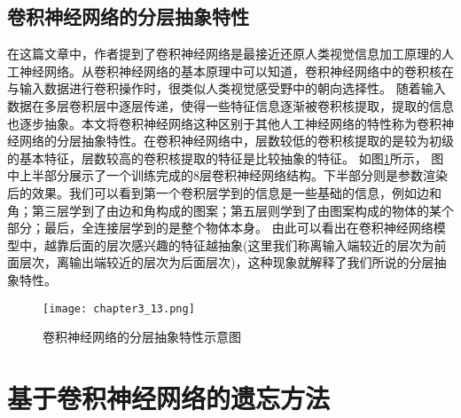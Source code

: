 \subsection{卷积神经网络的分层抽象特性}
在这篇文章\cite{2019arXiv190906161K}中，作者提到了卷积神经网络是最接近还原人类视觉信息加工原理的人工神经网络。从卷积神经网络的基本原理中可以知道，卷积神经网络中的卷积核在与输入数据进行卷积操作时，很类似人类视觉感受野中的朝向选择性。
随着输入数据在多层卷积层中逐层传递，使得一些特征信息逐渐被卷积核提取，提取的信息也逐步抽象。本文将卷积神经网络这种区别于其他人工神经网络的特性称为卷积神经网络的分层抽象特性。在卷积神经网络中，层数较低的卷积核提取的是较为初级的基本特征，层数较高的卷积核提取的特征是比较抽象的特征。
如图\ref{fig:chapter3_13}所示， 图中上半部分展示了一个训练完成的8层卷积神经网络结构。下半部分则是参数渲染后的效果。我们可以看到第一个卷积层学到的信息是一些基础的信息，例如边和角；第三层学到了由边和角构成的图案；第五层则学到了由图案构成的物体的某个部分；最后，全连接层学到的是整个物体本身。
由此可以看出在卷积神经网络模型中，越靠后面的层次感兴趣的特征越抽象(这里我们称离输入端较近的层次为前面层次，离输出端较近的层次为后面层次)，这种现象就解释了我们所说的分层抽象特性。
\begin{figure}
    \centering
    \texttt{[image: chapter3\_13.png]}
    \caption{卷积神经网络的分层抽象特性示意图\cite{luyujie2018}}
    \label{fig:chapter3_13}
\end{figure}

\section{基于卷积神经网络的遗忘方法}
